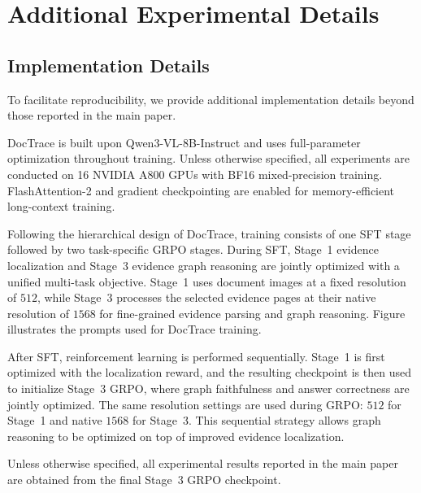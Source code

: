 \documentclass[letterpaper]{article} %
\begin{document}
\section{Additional Experimental Details}

\subsection{Implementation Details}

To facilitate reproducibility, we provide additional implementation details beyond those reported in the main paper.

DocTrace is built upon Qwen3-VL-8B-Instruct and uses full-parameter optimization throughout training. Unless otherwise specified, all experiments are conducted on 16 NVIDIA A800 GPUs with BF16 mixed-precision training. FlashAttention-2 and gradient checkpointing are enabled for memory-efficient long-context training.



Following the hierarchical design of DocTrace, training consists of one SFT stage followed by two task-specific GRPO stages. During SFT, Stage~1 evidence localization and Stage~3 evidence graph reasoning are jointly optimized with a unified multi-task objective. Stage~1 uses document images at a fixed resolution of $512$, while Stage~3 processes the selected evidence pages at their native resolution of $1568$ for fine-grained evidence parsing and graph reasoning. Figure illustrates the prompts used for DocTrace training.

After SFT, reinforcement learning is performed sequentially. Stage~1 is first optimized with the localization reward, and the resulting checkpoint is then used to initialize Stage~3 GRPO, where graph faithfulness and answer correctness are jointly optimized. The same resolution settings are used during GRPO: $512$ for Stage~1 and native $1568$ for Stage~3. This sequential strategy allows graph reasoning to be optimized on top of improved evidence localization.

Unless otherwise specified, all experimental results reported in the main paper are obtained from the final Stage~3 GRPO checkpoint.
\end{document}
